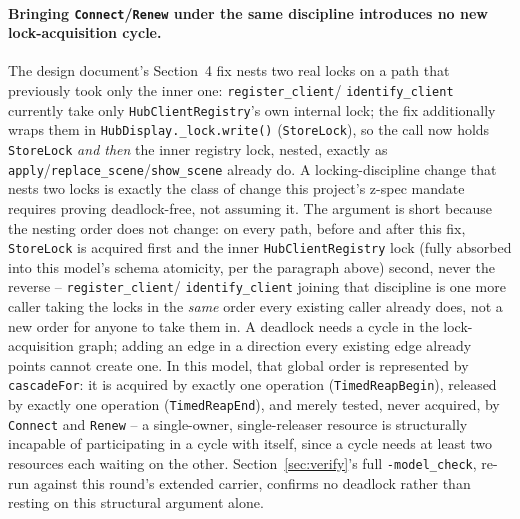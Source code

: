 \documentclass[a4paper,10pt,fleqn]{article}
\begin{document}
\paragraph{Bringing \texttt{Connect}/\texttt{Renew} under the same
discipline introduces no new lock-acquisition cycle.}
\label{sec:storelock-nesting}
The design document's Section~4 fix nests two real locks on a path that
previously took only the inner one: \texttt{register\_client}/
\texttt{identify\_client} currently take only \texttt{HubClientRegistry}'s
own internal lock; the fix additionally wraps them in
\texttt{HubDisplay.\_lock.write()} (\texttt{StoreLock}), so the call now
holds \texttt{StoreLock} \emph{and then} the inner registry lock, nested,
exactly as \texttt{apply}/\texttt{replace\_scene}/\texttt{show\_scene}
already do. A locking-discipline change that nests two locks is exactly
the class of change this project's z-spec mandate requires proving
deadlock-free, not assuming it. The argument is short because the nesting
order does not change: on every path, before and after this fix,
\texttt{StoreLock} is acquired first and the inner \texttt{HubClientRegistry}
lock (fully absorbed into this model's schema atomicity, per the paragraph
above) second, never the reverse -- \texttt{register\_client}/
\texttt{identify\_client} joining that discipline is one more caller taking
the locks in the \emph{same} order every existing caller already does, not
a new order for anyone to take them in. A deadlock needs a cycle in the
lock-acquisition graph; adding an edge in a direction every existing edge
already points cannot create one. In this model, that global order is
represented by \texttt{cascadeFor}: it is acquired by exactly one operation
(\texttt{TimedReapBegin}), released by exactly one operation
(\texttt{TimedReapEnd}), and merely tested, never acquired, by
\texttt{Connect} and \texttt{Renew} -- a single-owner, single-releaser
resource is structurally incapable of participating in a cycle with
itself, since a cycle needs at least two resources each waiting on the
other. Section~\ref{sec:verify}'s full \texttt{-model\_check}, re-run
against this round's extended carrier, confirms no deadlock rather than
resting on this structural argument alone.
\end{document}
